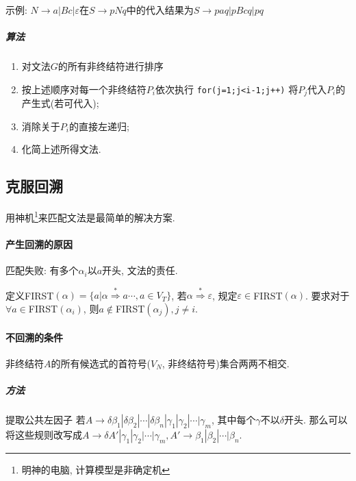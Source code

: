                     示例: $N\to a|Bc|\varepsilon$在$S\to pNq$中的代入结果为$S\to paq|pBcq|pq$

                \subparagraph{算法}

                    \begin{enumerate}
                        \item 对文法$G$的所有非终结符进行排序
                        \item 按上述顺序对每一个非终结符$P_i$依次执行
                                \texttt{for(j=1;j<i-1;j++)}
                                将$P_j$代入$P_i$的产生式(若可代入);
                        \item 消除关于$P_i$的直接左递归;
                        \item 化简上述所得文法.
                    \end{enumerate}

        \subsection{克服回溯}

            用神机\footnote{明神的电脑, 计算模型是非确定机}来匹配文法是最简单的解决方案.

            \paragraph{产生回溯的原因}

                匹配失败: 有多个$\alpha_i$以$a$开头, 文法的责任.

            定义FIRST$(\alpha)=\{a|\alpha\stackrel{*}{\Rightarrow}a\cdots, a\in V_T\}$, 若$\alpha\stackrel{*}{\Rightarrow}\varepsilon$, 规定$\varepsilon\in$FIRST$(\alpha)$. 要求对于$\forall a\in$FIRST$(\alpha_i)$, 则$a\not\in$FIRST$(\alpha_j), j\neq i$.

            \paragraph{不回溯的条件}

                非终结符$A$的所有候选式的首符号($V_N$, 非终结符号)集合两两不相交.

                \subparagraph{方法} \textsf{提取公共左因子}
                    若$A\to\delta\beta_1|\delta\beta_2|\cdots|\delta\beta_n|\gamma_1|\gamma_2|\cdots|\gamma_m$, 其中每个$\gamma$不以$\delta$开头. 那么可以将这些规则改写成$A\to\delta A'|\gamma_1|\gamma_2|\cdots|\gamma_m, A'\to\beta_1|\beta_2|\cdots|\beta_n$.

